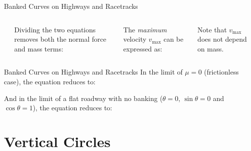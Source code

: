 \documentclass[12pt,compress,aspectratio=169]{beamer}
\begin{document}
\begin{frame}{Banked Curves on Highways and Racetracks}
  \begin{columns}
    \centering
    \\

    Dividing the two equations removes both the normal force and mass terms:


    The \emph{maximum} velocity $v_{\text{max}}$ can be expressed as:


    Note that $v_\text{max}$ does not depend on mass.
  \end{columns}
\end{frame}



\begin{frame}{Banked Curves on Highways and Racetracks}
  In the limit of $\mu=0$ (frictionless case), the equation reduces to:


  And in the limit of a flat roadway with no banking ($\theta=0$,
  $\sin\theta=0$ and $\cos\theta=1$), the equation reduces to:

\end{frame}



\section{Vertical Circles}
\end{document}
